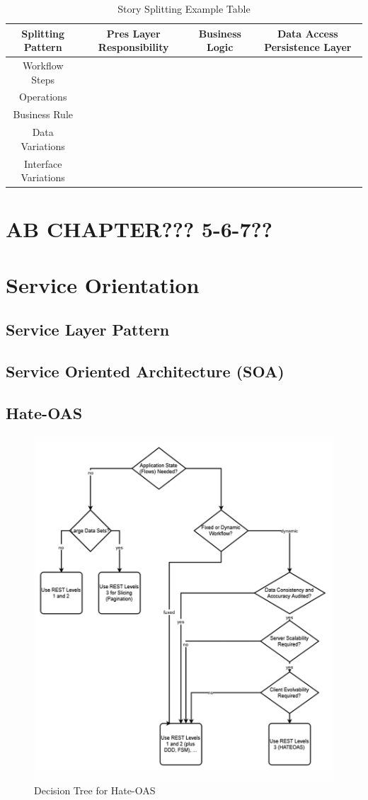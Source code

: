 \documentclass[../Main.tex]{subfiles}
\begin{document}
\begin{table}
    \centering
    \begin{tabular}{|c|c|c|c|} \hline 
         Splitting Pattern&  Pres Layer
Responsibility &  Business Logic& Data Access
Persistence Layer\\ \hline 
         Workflow Steps&  &  & \\ \hline 
         Operations&  &  & \\ \hline 
         Business Rule
&  &  & \\ \hline 
          Data Variations&  &  & \\ \hline 
 Interface Variations& & &\\ \hline
    \end{tabular}
    \caption{Story Splitting Example Table}
    \label{tab:storysplitex}
\end{table}

\section{AB CHAPTER??? 5-6-7??}

\section{Service Orientation}
\subsection{Service Layer Pattern}
\subsection{Service Oriented Architecture (SOA)}


\subsection{Hate-OAS}
\begin{figure}[H]
    \centering
    \includegraphics[width=0.5\linewidth]{Images/hate-oas-dectree.png}
    \caption{Decision Tree for Hate-OAS}
\end{figure}
\end{document}
